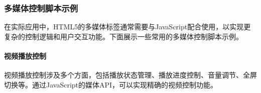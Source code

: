 \subsubsection{多媒体控制脚本示例}\label{ux591aux5a92ux4f53ux63a7ux5236ux811aux672cux793aux4f8b}

在实际应用中，HTML5的多媒体标签通常需要与JavaScript配合使用，以实现更复杂的控制逻辑和用户交互功能。下面展示一些常用的多媒体控制脚本示例。

\paragraph{视频播放控制}\label{ux89c6ux9891ux64adux653eux63a7ux5236}

视频播放控制涉及多个方面，包括播放状态管理、播放进度控制、音量调节、全屏切换等。通过JavaScript的媒体API，可以实现精确的视频控制功能。

